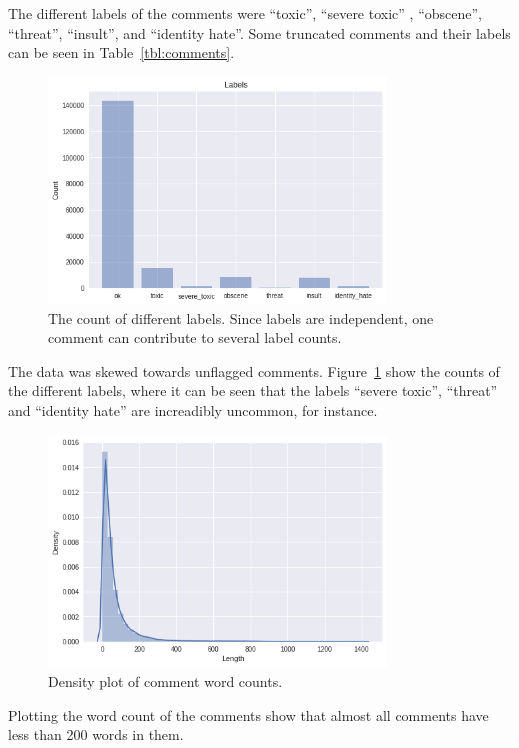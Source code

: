 The different labels of the comments were ``toxic'', ``severe toxic'' ,
``obscene'', ``threat'', ``insult'', and ``identity hate''. Some
truncated comments and their labels can be seen in
Table~\ref{tbl:comments}. 
\begin{figure}[H]
  \centering
  \includegraphics[width=0.8\textwidth]{graphics/label-dist}
  \caption{The count of different labels. Since labels are independent,
    one comment can contribute to several label counts.}\label{fig:labels-dist}
\end{figure}
The data was skewed towards unflagged comments. Figure~\ref{fig:labels-dist} show the counts of the
different labels, where it can be seen that the labels ``severe
toxic'', ``threat'' and ``identity hate'' are increadibly uncommon,
for instance.
\begin{figure}[H]
  \centering
  \includegraphics[width=0.8\textwidth]{graphics/comment-word-count}
  \caption{Density plot of comment word counts.}\label{fig:comment-word-count}
\end{figure}
Plotting the word count of the comments show that almost all comments
have less than 200 words in them.
